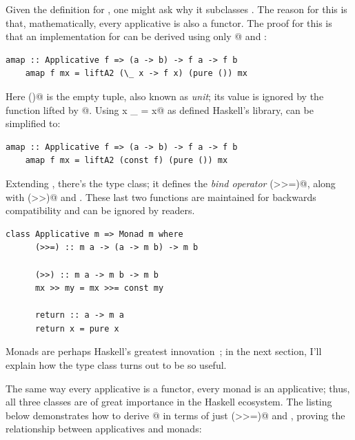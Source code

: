 \documentclass[UdineBachThesis,american,11pt]{PhdThesis}
\begin{document}
  Given the definition for \lstinline@Applicative@, one might ask why it
  subclasses \lstinline@Functor@. The reason for this is that, mathematically,
  every applicative is also a functor. The proof for this is that an
  implementation for \lstinline@fmap@ can be derived using only
  @ and \lstinline@pure@:

  \begin{lstlisting}[gobble=4,basicstyle=\ttfamily\small]
    amap :: Applicative f => (a -> b) -> f a -> f b
    amap f mx = liftA2 (\_ x -> f x) (pure ()) mx
  \end{lstlisting}

  Here \lstinline@()@ is the empty tuple, also known as \emph{unit}; its value
  is ignored by the function lifted by @. Using
  \lstinline@const x _ = x@ as defined Haskell's library, \lstinline@amap@ can
  be simplified to:

  \begin{lstlisting}[gobble=4,basicstyle=\ttfamily\small]
    amap :: Applicative f => (a -> b) -> f a -> f b
    amap f mx = liftA2 (const f) (pure ()) mx
  \end{lstlisting}

  Extending \lstinline@Applicative@, there's the \lstinline@Monad@ type class;
  it defines the \emph{bind operator} \lstinline@(>>=)@, along with
  \lstinline@(>>)@ and \lstinline@return@. These last two functions are
  maintained for backwards compatibility and can be ignored by readers.

  \begin{lstlisting}[gobble=4,basicstyle=\ttfamily\small]
    class Applicative m => Monad m where
      (>>=) :: m a -> (a -> m b) -> m b

      (>>) :: m a -> m b -> m b
      mx >> my = mx >>= const my

      return :: a -> m a
      return x = pure x
  \end{lstlisting}

  \newpage

  Monads are perhaps Haskell's greatest
  innovation~\cite{monads-for-functional-programming}; in the next section, I'll
  explain how the \lstinline@Monad@ type class turns out to be so useful.

  The same way every applicative is a functor, every monad is an applicative;
  thus, all three classes are of great importance in the Haskell ecosystem. The
  listing below demonstrates how to derive @ in terms of just
  \lstinline@(>>=)@ and \lstinline@return@, proving the relationship between
  applicatives and monads:
\end{document}
